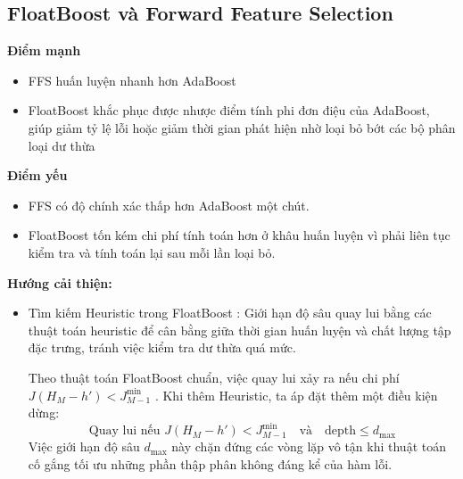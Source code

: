 \subsection{FloatBoost và Forward Feature Selection}
\textbf{Điểm mạnh}
\begin{itemize}
    \item FFS huấn luyện nhanh hơn AdaBoost
    \item FloatBoost khắc phục được nhược điểm tính phi đơn điệu của AdaBoost, giúp giảm tỷ lệ lỗi hoặc giảm thời gian phát hiện nhờ loại bỏ bớt các bộ phân loại dư thừa
\end{itemize}
\textbf{Điểm yếu}
\begin{itemize}
    \item FFS có độ chính xác thấp hơn AdaBoost một chút.
    \item FloatBoost tốn kém chi phí tính toán hơn ở khâu huấn luyện vì phải liên tục kiểm tra và tính toán lại sau mỗi lần loại bỏ.
\end{itemize}
\textbf{Hướng cải thiện:}
\begin{itemize}
  \item Tìm kiếm Heuristic trong FloatBoost \cite{li2004floatboost}: Giới hạn độ sâu quay lui bằng các thuật toán heuristic để cân bằng giữa thời gian huấn luyện và chất lượng tập đặc trưng, tránh việc kiểm tra dư thừa quá mức.

  Theo thuật toán FloatBoost chuẩn, việc quay lui xảy ra nếu chi phí $J(H_M - h') < J_{M-1}^{\min}$ \cite{li2004floatboost}. Khi thêm Heuristic, ta áp đặt thêm một điều kiện dừng:
    \begin{equation}
        \text{Quay lui nếu } J(H_M - h') < J_{M-1}^{\min} \quad \text{và} \quad \text{depth} \le d_{\max}
    \end{equation}
    Việc giới hạn độ sâu $d_{\max}$ này chặn đứng các vòng lặp vô tận khi thuật toán cố gắng tối ưu những phần thập phân không đáng kể của hàm lỗi.
\end{itemize}


